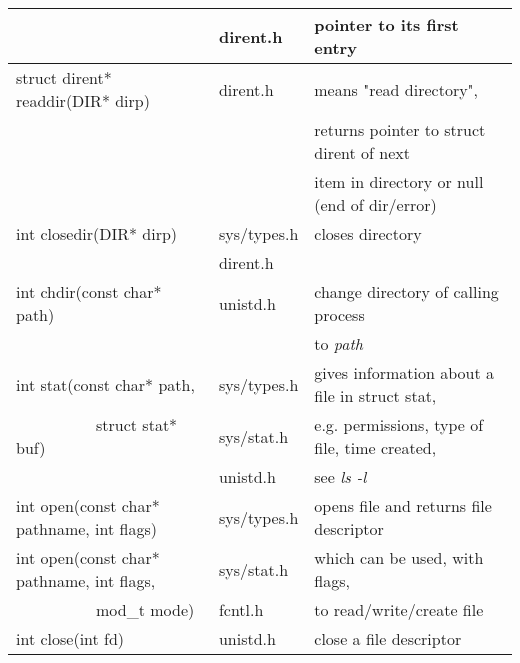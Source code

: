 \documentclass{article}
\begin{document}
\begin{longtable}{p{1.5in} l p{4in}}
    & dirent.h & pointer to its first entry
    \\ \hline
    struct dirent* readdir(DIR* dirp) & dirent.h & means "read directory",
    \\
    & & returns pointer to struct dirent of next 
    \\
    & & item in directory or null (end of dir/error)
    \\ \hline
    int closedir(DIR* dirp) & sys/types.h & closes  directory
    \\
    & dirent.h & %
    \\  \hline
    int chdir(const char* path) & unistd.h & change directory of calling process
    \\
    & & to \it path \rm
    \\ \hline
    int stat(const char* path, & sys/types.h & gives information about a file in struct stat,
    \\
    \ \ \ \ \ \ \ \ \ \ struct stat* buf) & sys/stat.h & e.g. permissions, type of file, time created,
    \\
    & unistd.h & see \it ls -l \rm
    \\ \hline
    int open(const char* pathname, int flags) & sys/types.h & opens file and returns file descriptor
    \\
    int open(const char* pathname, int flags, & sys/stat.h & which can be used, with flags,
    \\
    \ \ \ \ \ \ \ \ \ \ mod\_t mode) & fcntl.h & to read/write/create file
    \\ \hline
    int close(int fd) & unistd.h & close a file descriptor
    \\ \hline

\end{longtable}
\end{document}
